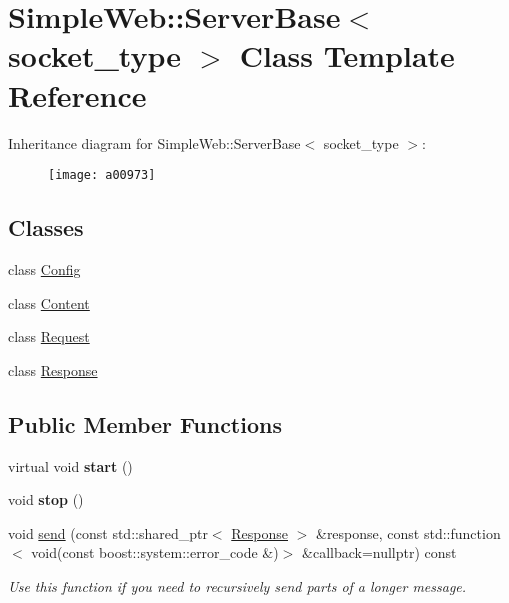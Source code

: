 \hypertarget{a00973}{}\section{Simple\+Web\+:\+:Server\+Base$<$ socket\+\_\+type $>$ Class Template Reference}
\label{a00973}
Inheritance diagram for Simple\+Web\+:\+:Server\+Base$<$ socket\+\_\+type $>$\+:\begin{figure}[H]
\begin{center}
\leavevmode
\texttt{[image: a00973]}
\end{center}
\end{figure}
\subsection*{Classes}
\begin{DoxyCompactItemize}
\item 
class \hyperlink{a00989}{Config}
\item 
class \hyperlink{a00981}{Content}
\item 
class \hyperlink{a00985}{Request}
\item 
class \hyperlink{a00977}{Response}
\end{DoxyCompactItemize}
\subsection*{Public Member Functions}
\begin{DoxyCompactItemize}
\item 
\mbox{\label{a00973_a759d6dae5fa77c47a36f7355fd33f8f7}} 
virtual void {\bfseries start} ()
\item 
\mbox{\label{a00973_a0667e44595f6c23016bee67c646ccc85}} 
void {\bfseries stop} ()
\item 
\mbox{\label{a00973_a93fd842b1a02dd63716ff0718f6069ce}} 
void \hyperlink{a00973_a93fd842b1a02dd63716ff0718f6069ce}{send} (const std\+::shared\+\_\+ptr$<$ \hyperlink{a00977}{Response} $>$ \&response, const std\+::function$<$ void(const boost\+::system\+::error\+\_\+code \&)$>$ \&callback=nullptr) const
\begin{DoxyCompactList}\small\item\em Use this function if you need to recursively send parts of a longer message. \end{DoxyCompactList}\end{DoxyCompactItemize}
